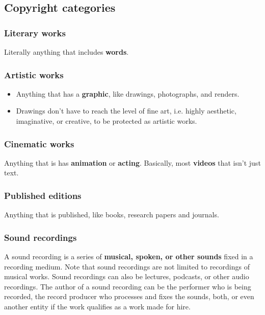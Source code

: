 \documentclass[11pt]{article}
\begin{document}
\subsection{Copyright categories}
\label{sec:org8f2c805}

\subsubsection{Literary works}
\label{sec:org9e43551}
Literally anything that includes \textbf{words}.

\subsubsection{Artistic works}
\label{sec:orgf71ae8e}
\begin{itemize}
\item Anything that has a \textbf{graphic}, like drawings, photographs, and renders.
\item Drawings don't have to reach the level of fine art, i.e. highly aesthetic, imaginative, or creative, to be protected as artistic works.
\end{itemize}

\subsubsection{Cinematic works}
\label{sec:orgd052654}
Anything that is has \textbf{animation} or \textbf{acting}. Basically, most \textbf{videos} that isn't just text.

\subsubsection{Published editions}
\label{sec:orge8067e5}
Anything that is published, like books, research papers and journals.

 \newpage

\subsubsection{Sound recordings}
\label{sec:orgb66d5a6}
A sound recording is a series of \textbf{musical, spoken, or other sounds} fixed in a recording medium. Note that sound recordings are not limited to recordings of musical works. Sound recordings can also be lectures, podcasts, or other audio recordings. The author of a sound recording can be the performer who is being recorded, the record producer who processes and fixes the sounds, both, or even another entity if the work qualifies as a work made for hire.
\end{document}
